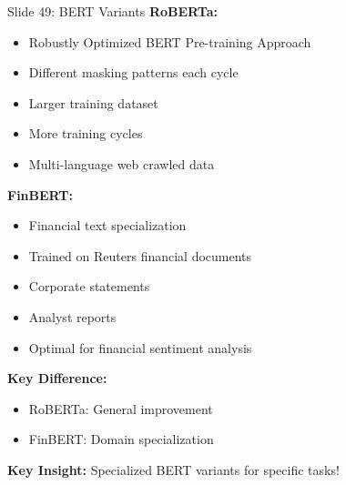 \documentclass[8pt]{beamer}
\begin{document}
	\begin{frame}{Slide 49: BERT Variants}
		\fontsize{6.5}{7.5}\selectfont
		\textbf{RoBERTa:}
		\begin{itemize}
			\item Robustly Optimized BERT Pre-training Approach
			\item Different masking patterns each cycle
			\item Larger training dataset
			\item More training cycles
			\item Multi-language web crawled data
		\end{itemize}
		
		\vspace{0.1cm}
		\textbf{FinBERT:}
		\begin{itemize}
			\item Financial text specialization
			\item Trained on Reuters financial documents
			\item Corporate statements
			\item Analyst reports
			\item Optimal for financial sentiment analysis
		\end{itemize}
		
		\vspace{0.1cm}
		\textbf{Key Difference:}
		\begin{itemize}
			\item RoBERTa: General improvement
			\item FinBERT: Domain specialization
		\end{itemize}
		
		\textcolor{myblue}{\textbf{Key Insight:}} Specialized BERT variants for specific tasks!
	\end{frame}
	
\end{document}
